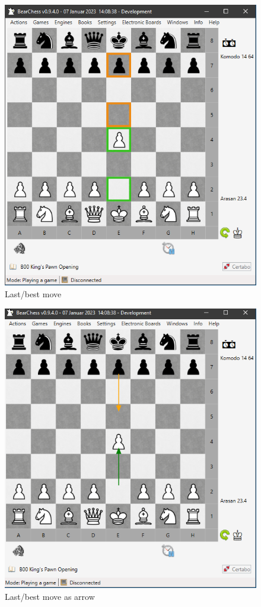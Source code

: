 \documentclass[11pt,a4paper]{article}
\begin{document}
\begin{figure}[H]
	\centering
	\includegraphics[scale=0.8]{LastMove.png}
	\caption{Last/best move }
	\label{fig:LastMove}
\end{figure}

\begin{figure}[H]
	\centering
	\includegraphics[scale=0.8]{LastMoveArrow.png}
	\caption{Last/best move as arrow}
	\label{fig:LastMove2}
\end{figure}
\end{document}
